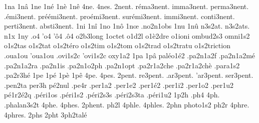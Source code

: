 {%
1na
1nâ
1ne
1né
1nè
1nê
4ne.
4nes.
      2nent. %
  réma3nent.
  imma3nent.
 perma3nent.
  .émi3nent.
préémi3nent.
proémi3nent.
surémi3nent.
  immi3nent.
 conti3nent.
 perti3nent.
 absti3nent.
%
1ni
1nî
1no
1nô
1nœ
                    .no2n1obs
1nu
1nû
                    n3s2at.
                    n3s2ats.
n1x
1ny
.o4
'o4
'ô4
.ô4
                    o2b3long
                    1octet %
                    o1d2l
                    o1è2dre
                    o1ioni
                    ombud2s3
                    omni1s2
                    o1s2tas
                    o1s2tat
                    o1s2téro
                    o1s2tim
                    o1s2tom
                    o1s2trad
                    o1s2tratu
                    o1s2triction
                    .oua1ou
                    'oua1ou
                    .ovi1s2c
                    'ovi1s2c
                    oxy1a2
1pa
1pâ
                    paléo1é2
                    .pa2n1a2f
                    .pa2n1a2mé
                    .pa2n1a2ra
                    .pa2n1is
                    .pa2n1o2ph
                    .pa2n1opt
                    .pa2r1a2che
                    .pa2r1a2chè
                    .para1s2
                    .pa2r3hé
1pe
1pé
1pè
1pê
4pe.
4pes.
   2pent.
 re3pent.
.ar3pent.
'ar3pent.
ser3pent.
%
                    .pen2ta %
                    per3h
                    pé2nul %
                    .pe4r
                    .per1a2
                    .per1e2
                    .per1é2
                    .per1i2
                    .per1o2
                    .per1u2
                    pé1r2é2q %
                    .péri1os
                    .péri1s2
                    .péri2s3s
                    .péri2s3ta
                    .péri1u2
1p2h
.ph4
4ph.
                    .phalan3s2t
4phe.
4phes.
2phent. %
ph2l
4phle.
4phles.
2phn
                    photo1s2
ph2r
4phre.
4phres.
2phs
2pht
                    3ph2talé
}
